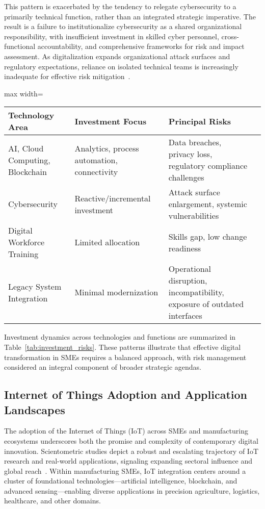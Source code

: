 This pattern is exacerbated by the tendency to relegate cybersecurity to a primarily technical function, rather than an integrated strategic imperative. The result is a failure to institutionalize cybersecurity as a shared organizational responsibility, with insufficient investment in skilled cyber personnel, cross-functional accountability, and comprehensive frameworks for risk and impact assessment. As digitalization expands organizational attack surfaces and regulatory expectations, reliance on isolated technical teams is increasingly inadequate for effective risk mitigation~\cite{ref35}.

\begin{table*}[htbp]
\centering
\caption{Key Investment Priorities and Associated Risks in SME Digital Transformation}
\label{tab:investment_risks}
\begin{adjustbox}{max width=\textwidth}
\begin{tabular}{llll}
\toprule
\textbf{Technology Area} & \textbf{Investment Focus} & \textbf{Principal Risks} \\
\midrule
AI, Cloud Computing, Blockchain & Analytics, process automation, connectivity & Data breaches, privacy loss, regulatory compliance challenges \\
Cybersecurity & Reactive/incremental investment & Attack surface enlargement, systemic vulnerabilities \\
Digital Workforce Training & Limited allocation & Skills gap, low change readiness \\
Legacy System Integration & Minimal modernization & Operational disruption, incompatibility, exposure of outdated interfaces \\
\bottomrule
\end{tabular}
\end{adjustbox}
\end{table*}

Investment dynamics across technologies and functions are summarized in Table~\ref{tab:investment_risks}. These patterns illustrate that effective digital transformation in SMEs requires a balanced approach, with risk management considered an integral component of broader strategic agendas.

\subsection{Internet of Things Adoption and Application Landscapes}

The adoption of the Internet of Things (IoT) across SMEs and manufacturing ecosystems underscores both the promise and complexity of contemporary digital innovation. Scientometric studies depict a robust and escalating trajectory of IoT research and real-world applications, signaling expanding sectoral influence and global reach~\cite{ref33}. Within manufacturing SMEs, IoT integration centers around a cluster of foundational technologies---artificial intelligence, blockchain, and advanced sensing---enabling diverse applications in precision agriculture, logistics, healthcare, and other domains.

